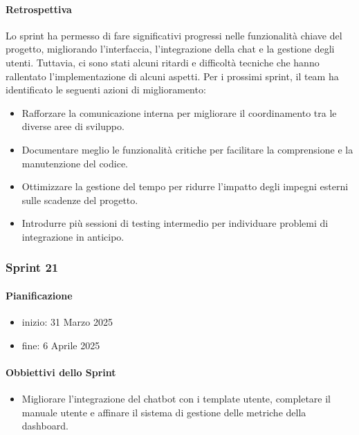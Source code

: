 \documentclass{article}
\begin{document}
            \paragraph{Retrospettiva}
            Lo sprint ha permesso di fare significativi progressi nelle funzionalità chiave del progetto, migliorando l'interfaccia, l'integrazione della chat e la gestione degli utenti. Tuttavia, ci sono stati alcuni ritardi e difficoltà tecniche che hanno rallentato l'implementazione di alcuni aspetti. Per i prossimi sprint, il team ha identificato le seguenti azioni di miglioramento:
            \begin{itemize}
                \item Rafforzare la comunicazione interna per migliorare il coordinamento tra le diverse aree di sviluppo.
                \item Documentare meglio le funzionalità critiche per facilitare la comprensione e la manutenzione del codice.
                \item Ottimizzare la gestione del tempo per ridurre l'impatto degli impegni esterni sulle scadenze del progetto.
                \item Introdurre più sessioni di testing intermedio per individuare problemi di integrazione in anticipo.
            \end{itemize}
                
            \subsubsection{Sprint 21}
            \paragraph{Pianificazione}
                \begin{itemize}
                    \item inizio: 31 Marzo 2025
                    \item fine: 6 Aprile 2025
                \end{itemize}
            
            \paragraph{Obbiettivi dello Sprint}
            \begin{itemize}
                \item Migliorare l'integrazione del chatbot con i template utente, completare il manuale utente e affinare il sistema di gestione delle metriche della dashboard.
            \end{itemize}
            
\end{document}
